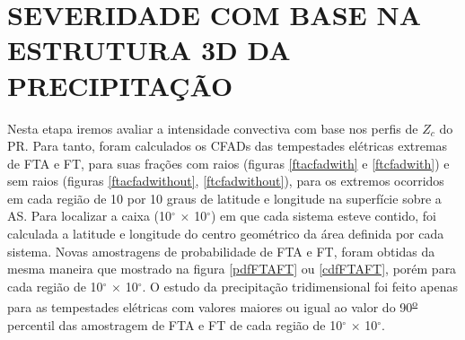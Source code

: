 


\section{SEVERIDADE COM BASE NA ESTRUTURA 3D DA PRECIPITAÇÃO}


Nesta etapa iremos avaliar a intensidade convectiva com base nos perfis de $Z_c$ do PR. Para tanto, foram calculados os CFADs das tempestades elétricas extremas de FTA e FT, para suas frações com raios (figuras \ref{ftacfadwith} e \ref{ftcfadwith}) e sem raios (figuras \ref{ftacfadwithout}, \ref{ftcfadwithout}), para os extremos ocorridos em cada região de 10 por 10 graus de latitude e longitude na superfície sobre a AS. Para localizar a caixa (10$^{\circ}$ $\times$ 10$^{\circ}$) em que cada sistema esteve contido, foi calculada a latitude e longitude do centro geométrico da área definida por cada sistema. Novas amostragens de probabilidade de FTA e FT, foram obtidas da mesma maneira que mostrado na figura \ref{pdfFTAFT} ou \ref{cdfFTAFT}, porém para cada região de 10$^{\circ}$ $\times$ 10$^{\circ}$. O estudo da precipitação tridimensional foi feito apenas para as tempestades elétricas com valores maiores ou igual ao valor do 90\textsuperscript{\underline{o}} percentil das amostragem de FTA e FT de cada região de 10$^{\circ}$ $\times$ 10$^{\circ}$.


